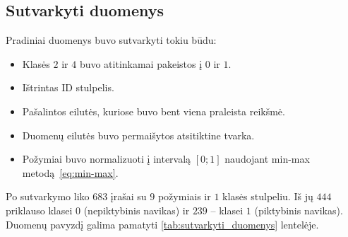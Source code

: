 \subsection{Sutvarkyti duomenys}
\label{subsec:sutvarkyti_duomenys}

Pradiniai duomenys buvo sutvarkyti tokiu būdu:
\begin{itemize}
    \item Klasės $2$ ir $4$ buvo atitinkamai pakeistos į $0$ ir $1$.
    \item Ištrintas ID stulpelis.
    \item Pašalintos eilutės, kuriose buvo bent viena praleista reikšmė.
    \item Duomenų eilutės buvo permaišytos atsitiktine tvarka.
    \item Požymiai buvo normalizuoti į intervalą $[0; 1]$ naudojant min-max metodą~\eqref{eq:min-max}.
\end{itemize}

Po sutvarkymo liko $683$ įrašai su $9$ požymiais ir $1$ klasės stulpeliu. Iš jų $444$ priklauso klasei $0$ (nepiktybinis navikas) ir $239$ – klasei $1$ (piktybinis navikas). Duomenų pavyzdį galima pamatyti \ref{tab:sutvarkyti_duomenys} lentelėje.

